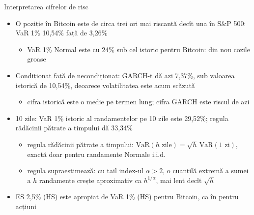 \begin{frame}{Interpretarea cifrelor de risc}
\itemsize{\small}
\begin{itemize}
    \item O poziție în Bitcoin este de circa trei ori mai riscantă decît una în S\&P 500: VaR 1\% 10{,}54\% față de 3{,}26\%
    \begin{itemize}
        \item VaR 1\% Normal este cu 24\% sub cel istoric pentru Bitcoin: din nou cozile groase
    \end{itemize}
    \item Condiționat față de necondiționat: GARCH-t dă azi 7{,}37\%, sub valoarea istorică de 10{,}54\%, deoarece volatilitatea este acum scăzută
    \begin{itemize}
        \item cifra istorică este o medie pe termen lung; cifra GARCH este riscul de azi
    \end{itemize}
    \item 10 zile: VaR 1\% istoric al randamentelor pe 10 zile este 29{,}52\%; regula rădăcinii pătrate a timpului dă 33{,}34\%
    \begin{itemize}
        \item regula rădăcinii pătrate a timpului: $\mathrm{VaR}(h\text{ zile}) = \sqrt{h}\,\mathrm{VaR}(1\text{ zi})$, exactă doar pentru randamente Normale i.i.d.
        \item regula supraestimează: cu tail index-ul $\alpha > 2$, o cuantilă extremă a sumei a $h$ randamente crește aproximativ ca $h^{1/\alpha}$, mai lent decît $\sqrt{h}$
    \end{itemize}
    \item ES 2,5\% (HS) este apropiat de VaR 1\% (HS) pentru Bitcoin, ca în  pentru acțiuni
\end{itemize}
\end{frame}


